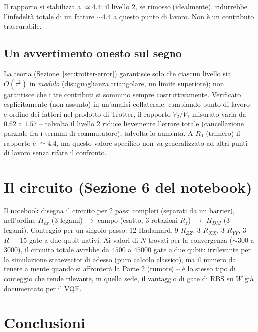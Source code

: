 \documentclass[11pt,a4paper]{article}
\begin{document}
Il rapporto si stabilizza a $\simeq4.4$: il livello 2, se rimosso
(idealmente), ridurrebbe l'infedeltà totale di un fattore $\sim4.4$ a
questo punto di lavoro. Non è un contributo trascurabile.

\subsection{Un avvertimento onesto sul segno}

La teoria (Sezione~\ref{sec:trotter-error}) garantisce solo che ciascun
livello sia $O(\tau^2)$ in \emph{modulo} (disuguaglianza triangolare, un
limite superiore); non garantisce che i tre contributi si sommino sempre
costruttivamente. Verificato esplicitamente (non assunto) in un'analisi
collaterale: cambiando punto di lavoro e ordine dei fattori nel prodotto
di Trotter, il rapporto $V_2/V_1$ misurato varia da $0.62$ a $1.57$ --
talvolta il livello 2 riduce lievemente l'errore totale (cancellazione
parziale fra i termini di commutatore), talvolta lo aumenta. A $R_0$
(trimero) il rapporto è $\simeq4.4$, ma questo valore specifico non va
generalizzato ad altri punti di lavoro senza rifare il confronto.

\section{Il circuito (Sezione 6 del notebook)}

Il notebook disegna il circuito per 2 passi completi (separati da un
barrier), nell'ordine $H_{ex}$ (3 legami) $\to$ campo (esatto, 3 rotazioni
$R_z$) $\to$ $H_{DM}$ (3 legami). Conteggio per un singolo passo: 12
Hadamard, 9 $R_{ZZ}$, 3 $R_{XX}$, 3 $R_{YY}$, 3 $R_z$ -- 15 gate a due
qubit nativi. Ai valori di $N$ trovati per la convergenza ($\sim300$ a
$3000$), il circuito totale avrebbe da $4500$ a $45000$ gate a due qubit:
irrilevante per la simulazione statevector di adesso (puro calcolo
classico), ma il numero da tenere a mente quando si affronterà la Parte 2
(rumore) -- è lo stesso tipo di conteggio che rende rilevante, in quella
sede, il vantaggio di gate di RBS su $W$ già documentato per il VQE.

\section{Conclusioni}
\end{document}
